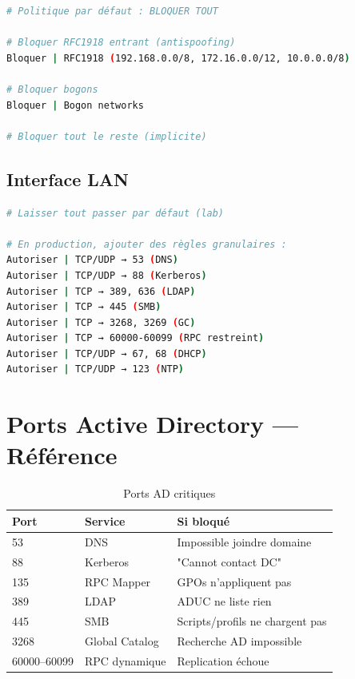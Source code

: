 \begin{lstlisting}[language=bash]
# Politique par défaut : BLOQUER TOUT

# Bloquer RFC1918 entrant (antispoofing)
Bloquer | RFC1918 (192.168.0.0/8, 172.16.0.0/12, 10.0.0.0/8)

# Bloquer bogons
Bloquer | Bogon networks

# Bloquer tout le reste (implicite)
\end{lstlisting}

\subsection{Interface LAN}

\begin{lstlisting}[language=bash]
# Laisser tout passer par défaut (lab)

# En production, ajouter des règles granulaires :
Autoriser | TCP/UDP → 53 (DNS)
Autoriser | TCP/UDP → 88 (Kerberos)
Autoriser | TCP → 389, 636 (LDAP)
Autoriser | TCP → 445 (SMB)
Autoriser | TCP → 3268, 3269 (GC)
Autoriser | TCP → 60000-60099 (RPC restreint)
Autoriser | TCP/UDP → 67, 68 (DHCP)
Autoriser | TCP/UDP → 123 (NTP)
\end{lstlisting}

\section{Ports Active Directory — Référence}

\begin{table}[H]
    \centering
    \begin{tabularx}{\textwidth}{|l|l|p{4cm}|}
        \hline
        \textbf{Port} & \textbf{Service} & \textbf{Si bloqué} \\
        \hline
        53 & DNS & Impossible joindre domaine \\
        \hline
        88 & Kerberos & "Cannot contact DC" \\
        \hline
        135 & RPC Mapper & GPOs n'appliquent pas \\
        \hline
        389 & LDAP & ADUC ne liste rien \\
        \hline
        445 & SMB & Scripts/profils ne chargent pas \\
        \hline
        3268 & Global Catalog & Recherche AD impossible \\
        \hline
        60000–60099 & RPC dynamique & Replication échoue \\
        \hline
    \end{tabularx}
    \caption{Ports AD critiques}
    \label{tab:ad-ports}
\end{table}

